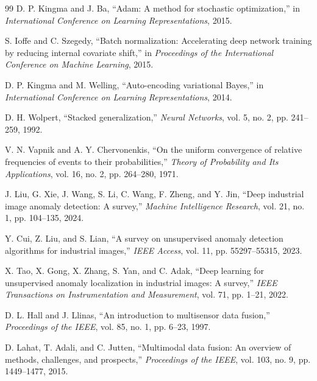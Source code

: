 \documentclass[10pt,conference]{IEEEtran}
\begin{document}
\begin{thebibliography}{99}
D. P. Kingma and J. Ba, ``Adam: A method for stochastic optimization,''
in \emph{International Conference on Learning Representations}, 2015.

S. Ioffe and C. Szegedy, ``Batch normalization: Accelerating deep network
training by reducing internal covariate shift,'' in \emph{Proceedings of
the International Conference on Machine Learning}, 2015.

D. P. Kingma and M. Welling, ``Auto-encoding variational Bayes,'' in
\emph{International Conference on Learning Representations}, 2014.

D. H. Wolpert, ``Stacked generalization,'' \emph{Neural Networks},
vol. 5, no. 2, pp. 241--259, 1992.

V. N. Vapnik and A. Y. Chervonenkis, ``On the uniform convergence of
relative frequencies of events to their probabilities,'' \emph{Theory of
Probability and Its Applications}, vol. 16, no. 2, pp. 264--280, 1971.

J. Liu, G. Xie, J. Wang, S. Li, C. Wang, F. Zheng, and Y. Jin, ``Deep
industrial image anomaly detection: A survey,'' \emph{Machine Intelligence
Research}, vol. 21, no. 1, pp. 104--135, 2024.

Y. Cui, Z. Liu, and S. Lian, ``A survey on unsupervised anomaly detection
algorithms for industrial images,'' \emph{IEEE Access}, vol. 11,
pp. 55297--55315, 2023.

X. Tao, X. Gong, X. Zhang, S. Yan, and C. Adak, ``Deep learning for
unsupervised anomaly localization in industrial images: A survey,''
\emph{IEEE Transactions on Instrumentation and Measurement}, vol. 71,
pp. 1--21, 2022.

D. L. Hall and J. Llinas, ``An introduction to multisensor data fusion,''
\emph{Proceedings of the IEEE}, vol. 85, no. 1, pp. 6--23, 1997.

D. Lahat, T. Adali, and C. Jutten, ``Multimodal data fusion: An overview
of methods, challenges, and prospects,'' \emph{Proceedings of the IEEE},
vol. 103, no. 9, pp. 1449--1477, 2015.


\end{thebibliography}
\end{document}
